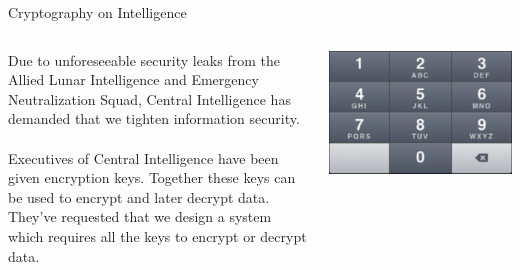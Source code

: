 \documentclass[xcolor=dvipsnames]{beamer}
\begin{document}
	\begin{frame}{Cryptography on Intelligence}
		\begin{columns}
			\begin{column}{0.5\textwidth}
          Due to unforeseeable security leaks from the Allied Lunar Intelligence and Emergency Neutralization Squad, Central Intelligence has demanded that we tighten information security.
          \\~\\
          Executives of Central Intelligence have been given encryption keys. Together these keys can be used to encrypt and later decrypt data. They've requested that we design a system which requires all the keys to encrypt or decrypt data.
			\end{column}
			\begin{column}{0.5\textwidth}
				\includegraphics[width=\textwidth]{images/keypad}
			\end{column}
		\end{columns}
	\end{frame}
	
\end{document}
